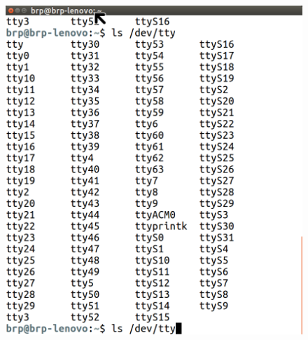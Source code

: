 \documentclass[12pt,a4paper]{article}
\begin{document}
\begin{figure}[h!]
    \centering
	\includegraphics[width=15cm, height=13cm]{Introduction/8.png}
\end{figure}
\vspace{2mm}
\end{document}
